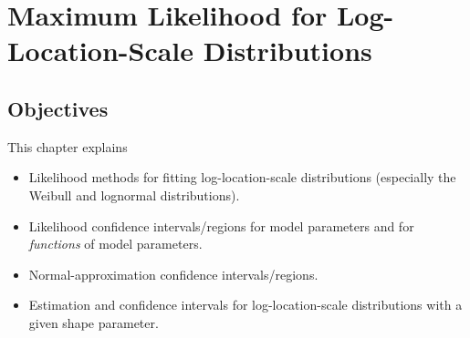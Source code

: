 
\setcounter{chapter}{7}


\chapter{Maximum Likelihood for Log-Location-Scale Distributions}
\label{chapter:parametric.ml.ls}




\section*{Objectives}
This chapter explains
\begin{itemize} 
\item 
Likelihood methods for fitting log-location-scale distributions
(especially the Weibull and lognormal distributions).
\item 
Likelihood confidence intervals/regions
for model parameters and for {\em functions} of model parameters.
\item 
Normal-approximation confidence intervals/regions.
\item
Estimation and confidence intervals for log-location-scale
distributions
with a given shape parameter.
\end{itemize}

